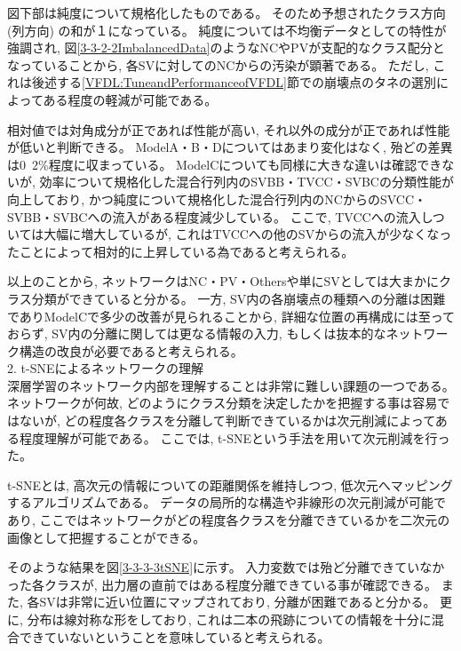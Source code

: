 図下部は純度について規格化したものである。
そのため予想されたクラス方向 (列方向) の和が１になっている。
純度については不均衡データとしての特性が強調され, 図\ref{3-3-2-2ImbalancedData}のようなNCやPVが支配的なクラス配分となっていることから, 各SVに対してのNCからの汚染が顕著である。
ただし, これは後述する\ref{VFDL:TuneandPerformanceofVFDL}節での崩壊点のタネの選別によってある程度の軽減が可能である。

相対値では対角成分が正であれば性能が高い, それ以外の成分が正であれば性能が低いと判断できる。
ModelA・B・Dについてはあまり変化はなく, 殆どの差異は$0$~$2$\%程度に収まっている。
ModelCについても同様に大きな違いは確認できないが, 効率について規格化した混合行列内のSVBB・TVCC・SVBCの分類性能が向上しており, かつ純度について規格化した混合行列内のNCからのSVCC・SVBB・SVBCへの流入がある程度減少している。
ここで, TVCCへの流入しついては大幅に増大しているが, これはTVCCへの他のSVからの流入が少なくなったことによって相対的に上昇している為であると考えられる。

以上のことから, ネットワークはNC・PV・Othersや単にSVとしては大まかにクラス分類ができていると分かる。
一方, SV内の各崩壊点の種類への分離は困難でありModelCで多少の改善が見られることから, 詳細な位置の再構成には至っておらず, SV内の分離に関しては更なる情報の入力, もしくは抜本的なネットワーク構造の改良が必要であると考えられる。\\

2. t-SNEによるネットワークの理解\\

深層学習のネットワーク内部を理解することは非常に難しい課題の一つである。
ネットワークが何故, どのようにクラス分類を決定したかを把握する事は容易ではないが, どの程度各クラスを分離して判断できているかは次元削減によってある程度理解が可能である。
ここでは, t-SNEという手法を用いて次元削減を行った。

t-SNEとは, 高次元の情報についての距離関係を維持しつつ, 低次元へマッピングするアルゴリズムである。
データの局所的な構造や非線形の次元削減が可能であり, ここではネットワークがどの程度各クラスを分離できているかを二次元の画像として把握することができる。

そのような結果を図\ref{3-3-3-3tSNE}に示す。
入力変数では殆ど分離できていなかった各クラスが, 出力層の直前ではある程度分離できている事が確認できる。
また, 各SVは非常に近い位置にマップされており, 分離が困難であると分かる。
更に, 分布は線対称な形をしており, これは二本の飛跡についての情報を十分に混合できていないということを意味していると考えられる。


